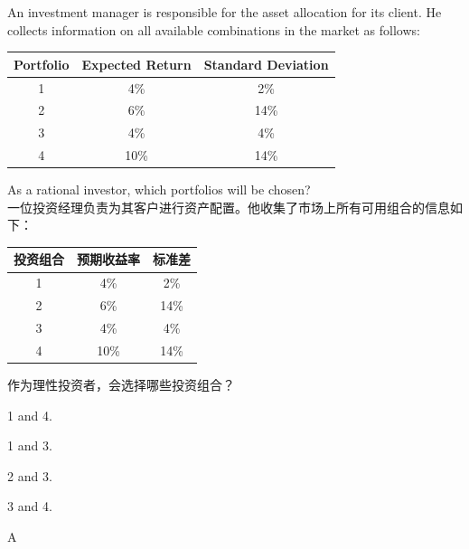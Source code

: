 \documentclass{article}
\newcounter{question} %
\begin{document}
\begin{question}
    An investment manager is responsible for the asset allocation for its client. He collects information on all available combinations in the market as follows:\\

    \begin{center}
    \begin{tabular}{|c|c|c|}
    \hline
    Portfolio & Expected Return & Standard Deviation \\
    \hline
    1 & 4\% & 2\% \\
    2 & 6\% & 14\% \\
    3 & 4\% & 4\% \\
    4 & 10\% & 14\% \\
    \hline
    \end{tabular}
    \end{center}

    As a rational investor, which portfolios will be chosen?
    \\
    一位投资经理负责为其客户进行资产配置。他收集了市场上所有可用组合的信息如下：\\
    
    \begin{center}
    \begin{tabular}{|c|c|c|}
    \hline
    投资组合 & 预期收益率 & 标准差 \\
    \hline
    1 & 4\% & 2\% \\
    2 & 6\% & 14\% \\
    3 & 4\% & 4\% \\
    4 & 10\% & 14\% \\
    \hline
    \end{tabular}
    \end{center}

    作为理性投资者，会选择哪些投资组合？
  
   
       
        \begin{choices}
            \item 1 and 4.
            \item 1 and 3.
            \item 2 and 3.
            \item 3 and 4.
        \end{choices}
   
\end{question}

\begin{correctanswer}
    A
\end{correctanswer}
\end{document}

